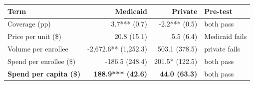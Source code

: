 \begin{tabular}{@{}l rr l@{}}
\toprule
Term & Medicaid & Private & Pre-test \\
\midrule
Coverage (pp) & 3.7*** (0.7) & -2.2*** (0.5) & both pass \\
Price per unit (\$) & 20.8 (15.1) & 5.5 (6.4) & Medicaid fails \\
Volume per enrollee & -2,672.6** (1,252.3) & 503.1 (378.5) & private fails \\
Spend per enrollee (\$) & -186.5 (248.4) & 201.5* (122.5) & both pass \\
\midrule
\textbf{Spend per capita (\$)} & \textbf{188.9*** (42.6)} & \textbf{44.0 (63.3)} & both pass \\
\bottomrule
\end{tabular}
